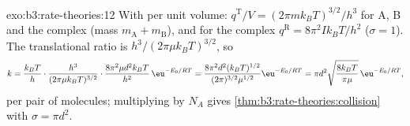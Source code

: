 \begin{solution}{exo:b3:rate-theories:12}
With  per unit volume: $q^{\mathrm T}/V = (2\pi mk_BT)^{3/2}/h^3$ for
A, B and the complex (mass $m_{\mathrm A} + m_{\mathrm B}$), and for the complex $q^{\mathrm R} = 8\pi^2Ik_BT/h^2$
($\sigma = 1$). The translational ratio is $h^3/(2\pi\mu k_BT)^{3/2}$, so
\[
  k = \frac{k_BT}{h}\cdot\frac{h^3}{(2\pi\mu k_BT)^{3/2}}\cdot\frac{8\pi^2\mu d^2k_BT}{h^2}\,\eu^{-E_0/RT}
    = \frac{8\pi^2d^2(k_BT)^{1/2}}{(2\pi)^{3/2}\mu^{1/2}}\eu^{-E_0/RT}
    = \pi d^2\sqrt{\frac{8k_BT}{\pi\mu}}\,\eu^{-E_0/RT},
\]
per pair of molecules; multiplying by $N_A$ gives \cref{thm:b3:rate-theories:collision}
with $\sigma = \pi d^2$.
\end{solution}

